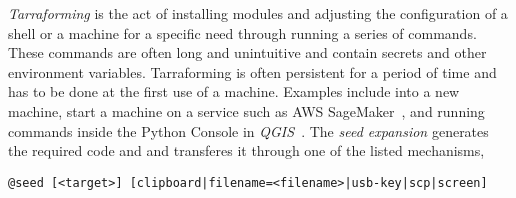 
\emph{Tarraforming} is the act of installing modules and adjusting the configuration of a shell or a machine for a specific need through running a series of commands. These commands are often long and unintuitive and contain secrets and other environment variables. Tarraforming is often persistent for a period of time and has to be done at the first use of a machine. Examples include  into a new machine, start a machine on a service such as AWS SageMaker~\cite{sagemaker}, and running commands inside the Python Console in \emph{QGIS}~\cite{QGIS_python_console}. The \emph{seed expansion} generates the required code and and transferes it through one of the listed mechanisms,
%
\begin{verbatim}
@seed [<target>] [clipboard|filename=<filename>|usb-key|scp|screen]
\end{verbatim}
